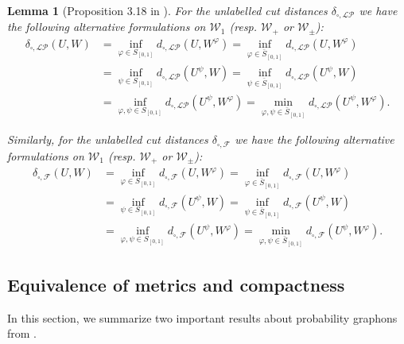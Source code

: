\documentclass[11pt]{article}
\newtheorem{lemma}[theorem]{Lemma}
\newcommand{\cF}{{\mathcal F}}  %
\newcommand{\signed}{\pm}
\newcommand{\Graphon}{\mathcal{W}_1}
\newcommand{\Kernel}{\mathcal{W}_{\signed}}
\newcommand{\Kernelp}{\mathcal{W}_{+}}
\newcommand{\InvRelabel}{S_{[0,1]}}
\newcommand{\Relabel}{\bar{S}_{[0,1]}}
\begin{document}
\begin{lemma}[Proposition 3.18 in \cite{abraham2023probabilitygraphons}]\label{thm_min_dist}
  For the unlabelled cut distances $\delta_{\square,\mathcal{LP}}$ we have the following alternative formulations on $\Graphon$ (resp. $\Kernelp$ or $\Kernel$):
\begin{equation}
  \label{eq_premetric}
  \begin{aligned}
\delta_{\square,\mathcal{LP}}(U,W) 
& = \underset{\varphi\in \InvRelabel}{\inf} d_{\square,\mathcal{LP}}(U,W^\varphi) 
  = \underset{\varphi\in \Relabel}{\inf} d_{\square,\mathcal{LP}}(U,W^\varphi)\\
& = \underset{\psi\in \InvRelabel}{\inf} d_{\square,\mathcal{LP}}(U^\psi,W) 
= \underset{\psi\in \Relabel}{\inf} d_{\square,\mathcal{LP}}(U^\psi,W) 	\\
& = \underset{\varphi, \psi\in \InvRelabel}{\inf} d_{\square,\mathcal{LP}}(U^\psi,W^\varphi) 
= \underset{\varphi,\psi\in \Relabel}{\min} d_{\square,\mathcal{LP}}(U^\psi,W^\varphi).
\end{aligned}
\end{equation}

Similarly, for the unlabelled cut distances $\delta_{\square,\cF}$ we have the following alternative formulations on $\Graphon$ (resp. $\Kernelp$ or $\Kernel$): 
\begin{equation}
  \label{eq_premetric2}
  \begin{aligned}
\delta_{\square,\cF}(U,W) 
& = \underset{\varphi\in \InvRelabel}{\inf} d_{\square,\cF}(U,W^\varphi) 
  = \underset{\varphi\in \Relabel}{\inf} d_{\square,\cF}(U,W^\varphi)\\
& = \underset{\psi\in \InvRelabel}{\inf} d_{\square,\cF}(U^\psi,W) 
= \underset{\psi\in \Relabel}{\inf} d_{\square,\cF}(U^\psi,W) 	\\
& = \underset{\varphi, \psi\in \InvRelabel}{\inf} d_{\square,\cF}(U^\psi,W^\varphi) 
= \underset{\varphi,\psi\in \Relabel}{\min} d_{\square,\cF}(U^\psi,W^\varphi).
\end{aligned}
\end{equation}
\end{lemma}

\subsection{Equivalence of metrics and compactness}
In this section, we summarize two important results about probability graphons from \cite{abraham2023probabilitygraphons}.
\end{document}
